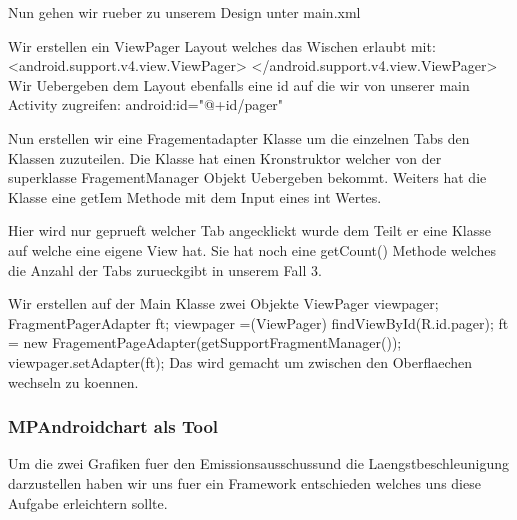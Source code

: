 Nun gehen wir rueber zu unserem Design unter main.xml

Wir erstellen ein ViewPager Layout welches das Wischen erlaubt mit:
\newline
<android.support.v4.view.ViewPager> </android.support.v4.view.ViewPager>
\newline
Wir Uebergeben dem Layout ebenfalls eine id auf die wir von unserer main Activity zugreifen: 
\newline
android:id="@+id/pager"

\newline

Nun erstellen wir eine Fragementadapter Klasse um die einzelnen Tabs den Klassen zuzuteilen. 
Die Klasse hat einen Kronstruktor welcher von der superklasse FragementManager Objekt Uebergeben bekommt.
Weiters hat die Klasse eine getIem Methode mit dem Input eines int Wertes. 


Hier wird nur geprueft welcher Tab angecklickt wurde dem Teilt er eine Klasse auf welche eine eigene View hat.
Sie hat noch eine getCount() Methode welches die Anzahl der Tabs zurueckgibt in unserem Fall 3.
\newline

Wir erstellen auf der Main Klasse zwei Objekte 
\newline
ViewPager viewpager;
\newline
FragmentPagerAdapter ft;
\newline
viewpager =(ViewPager) findViewById(R.id.pager);
\newline
ft = new FragementPageAdapter(getSupportFragmentManager());
\newline
viewpager.setAdapter(ft);
\newline
Das wird gemacht um zwischen den Oberflaechen wechseln zu koennen.
\newline
 
\subsubsection{MPAndroidchart als Tool}
Um die zwei Grafiken fuer den Emissionsausschussund die Laengstbeschleunigung darzustellen haben wir uns fuer ein Framework entschieden welches uns diese Aufgabe erleichtern sollte.


